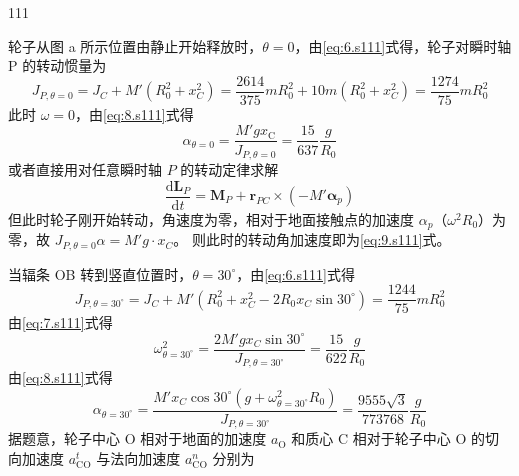 \begin{solution}{111}
\begin{subsolution}
        轮子从图 a 所示位置由静止开始释放时，$\theta=0$，由\eqref{eq:6.s111}式得，轮子对瞬时轴 P 的转动惯量为
        \begin{equation}
            J_{P,\theta=0} = J_{C} + M' \left(R_{0}^{2} + x_{C}^{2}\right) = \frac{2614}{375} m R_{0}^{2} + 10 m \left(R_{0}^{2} + x_{C}^{2}\right) = \frac{1274}{75} m R_{0}^{2}
        \end{equation}
        此时 $\omega = 0$，由\eqref{eq:8.s111}式得
        \begin{equation}
            \alpha_{\theta=0} = \frac{M' g x_{\mathrm{C}}}{J_{P,\theta=0}} = \frac{15}{637} \frac{g}{R_{0}}
            \label{eq:9.s111}
        \end{equation}
        或者直接用对任意瞬时轴 $P$ 的转动定律求解
        \begin{equation}
            \frac{\mathrm{d} \boldsymbol{L}_{P}}{\mathrm{d}t} = \boldsymbol{M}_{P} + \boldsymbol{r}_{PC} \times (- M' \boldsymbol{\alpha}_{p})
        \end{equation}
        但此时轮子刚开始转动，角速度为零，相对于地面接触点的加速度 $\alpha_{p}$（$\omega^{2} R_{0}$）为零，故 $J_{P,\theta=0}\alpha = M'g \cdot x_{C}$。
        则此时的转动角加速度即为\eqref{eq:9.s111}式。
    \end{subsolution}
    \begin{subsolution}
        当辐条 OB 转到竖直位置时，$\theta = 30^{\circ}$，由\eqref{eq:6.s111}式得
        \begin{equation}
            J_{P,\theta=30^{\circ}} = J_{C} + M' \left(R_{0}^{2} + x_{C}^{2} - 2 R_{0} x_{C} \sin 30^{\circ}\right) = \frac{1244}{75} m R_{0}^{2}
            \label{eq:10.s111}
        \end{equation}
        由\eqref{eq:7.s111}式得
        \begin{equation}
            \omega_{\theta=30^{\circ}}^{2} = \frac{2 M' g x_{C} \sin 30^{\circ}}{J_{P,\theta=30^{\circ}}} = \frac{15}{622} \frac{g}{R_{0}}
            \label{eq:11.s111}
        \end{equation}
        由\eqref{eq:8.s111}式得
        \begin{equation}
            \alpha_{\theta=30^{\circ}} = \frac{M' x_{C} \cos 30^{\circ} \left(g + \omega_{\theta=30^{\circ}}^{2} R_{0}\right)}{J_{P,\theta=30^{\circ}}} = \frac{9555 \sqrt{3}}{773768} \frac{g}{R_{0}}
            \label{eq:12.s111}
        \end{equation}
        据题意，轮子中心 O 相对于地面的加速度 $a_{\mathrm{O}}$ 和质心 C 相对于轮子中心 O 的切向加速度 $a_{\mathrm{CO}}^{t}$ 与法向加速度 $a_{\mathrm{CO}}^{n}$ 分别为

\end{subsolution}
\end{solution}
